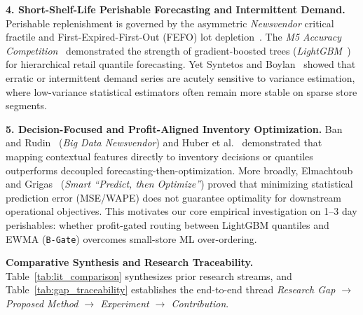 \textbf{4. Short-Shelf-Life Perishable Forecasting and Intermittent Demand.}
Perishable replenishment is governed by the asymmetric \emph{Newsvendor} critical fractile and First-Expired-First-Out (FEFO) lot depletion~\cite{nahmias2011perishable,silver2017inventory}. The \emph{M5 Accuracy Competition}~\cite{makridakis2022m5} demonstrated the strength of gradient-boosted trees (\emph{LightGBM}~\cite{ke2017lightgbm}) for hierarchical retail quantile forecasting. Yet Syntetos and Boylan~\cite{syntetos2005intermittent} showed that erratic or intermittent demand series are acutely sensitive to variance estimation, where low-variance statistical estimators often remain more stable on sparse store segments.

\textbf{5. Decision-Focused and Profit-Aligned Inventory Optimization.}
Ban and Rudin~\cite{ban2019bigdata} (\emph{Big Data Newsvendor}) and Huber et al.~\cite{huber2019newsvendor} demonstrated that mapping contextual features directly to inventory decisions or quantiles outperforms decoupled forecasting-then-optimization. More broadly, Elmachtoub and Grigas~\cite{elmachtoub2022spo} (\emph{Smart ``Predict, then Optimize''}) proved that minimizing statistical prediction error (MSE/WAPE) does not guarantee optimality for downstream operational objectives. This motivates our core empirical investigation on 1--3 day perishables: whether profit-gated routing between LightGBM quantiles and EWMA (\texttt{B-Gate}) overcomes small-store ML over-ordering.

\textbf{Comparative Synthesis and Research Traceability.}
Table~\ref{tab:lit_comparison} synthesizes prior research streams, and Table~\ref{tab:gap_traceability} establishes the end-to-end thread \emph{Research Gap $\to$ Proposed Method $\to$ Experiment $\to$ Contribution}.

